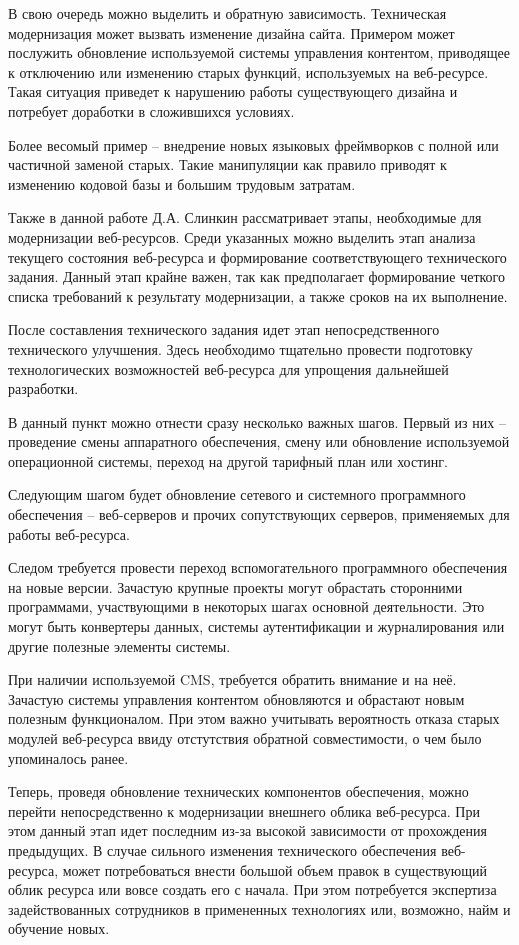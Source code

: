 В свою очередь можно выделить и обратную зависимость.
Техническая модернизация может вызвать изменение дизайна сайта.
Примером может послужить обновление используемой системы управления контентом, приводящее к отключению или изменению старых функций, используемых на веб-ресурсе.
Такая ситуация приведет к нарушению работы существующего дизайна и потребует доработки в сложившихся условиях.

Более весомый пример -- внедрение новых языковых фреймворков с полной или частичной заменой старых.
Такие манипуляции как правило приводят к изменению кодовой базы и большим трудовым затратам. 

Также в данной работе Д.А. Слинкин рассматривает этапы, необходимые для модернизации веб-ресурсов.
Среди указанных можно выделить этап анализа текущего состояния веб-ресурса и формирование соответствующего технического задания.
Данный этап крайне важен, так как предполагает формирование четкого списка требований к результату модернизации, а также сроков на их выполнение.

После составления технического задания идет этап непосредственного технического улучшения.
Здесь необходимо тщательно провести подготовку технологических возможностей веб-ресурса для упрощения дальнейшей разработки.

В данный пункт можно отнести сразу несколько важных шагов.
Первый из них -- проведение смены аппаратного обеспечения, смену или обновление используемой операционной системы, переход на другой тарифный план или хостинг.

Следующим шагом будет обновление сетевого и системного программного обеспечения -- веб-серверов и прочих сопутствующих серверов, применяемых для работы веб-ресурса.

Следом требуется провести переход вспомогательного программного обеспечения на новые версии.
Зачастую крупные проекты могут обрастать сторонними программами, участвующими в некоторых шагах основной деятельности.
Это могут быть конвертеры данных, системы аутентификации и журналирования или другие полезные элементы системы.

При наличии используемой CMS, требуется обратить внимание и на неё.
Зачастую системы управления контентом обновляются и обрастают новым полезным функционалом.
При этом важно учитывать вероятность отказа старых модулей веб-ресурса ввиду отстутствия обратной совместимости, о чем было упоминалось ранее.

Теперь, проведя обновление технических компонентов обеспечения, можно перейти непосредственно к модернизации внешнего облика веб-ресурса.
При этом данный этап идет последним из-за высокой зависимости от прохождения предыдущих.
В случае сильного изменения технического обеспечения веб-ресурса, может потребоваться внести большой объем правок в существующий облик ресурса или вовсе создать его с начала.
При этом потребуется экспертиза задействованных сотрудников в примененных технологиях или, возможно, найм и обучение новых.

